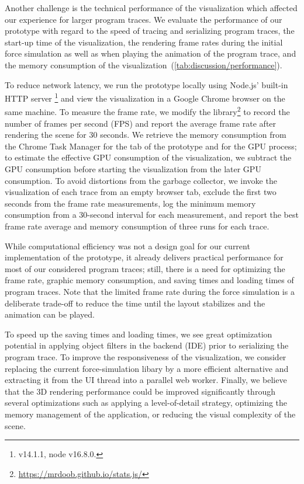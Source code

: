 Another challenge is the technical performance of the visualization which affected our experience for larger program traces.
We evaluate the performance of our prototype with regard to the speed of tracing and serializing program traces, the start-up time of the visualization, the rendering frame rates during the initial force simulation as well as when playing the animation of the program trace, and the memory consumption of the visualization~(\cref{tab:discussion/performance}).

To reduce network latency, we run the \tfd{} prototype locally using Node.js' built-in HTTP server \footnote{ v14.1.1, node v16.8.0.} and view the visualization in a Google Chrome browser on the same machine.
To measure the frame rate, we modify the  library\footnote{\url{https://mrdoob.github.io/stats.js/}} to record the number of frames per second (FPS) and report the average frame rate after rendering the scene for 30 seconds.
We retrieve the memory consumption from the Chrome Task Manager for the tab of the \tfd{} prototype and for the GPU process; to estimate the effective GPU consumption of the visualization, we subtract the GPU consumption before starting the visualization from the later GPU consumption.
To avoid distortions from the garbage collector, we invoke the visualization of each trace from an empty browser tab, exclude the first two seconds from the frame rate measurements, log the minimum memory consumption from a 30-second interval for each measurement, and report the best frame rate average and memory consumption of three runs for each trace.

While computational efficiency was not a design goal for our current implementation of the \tfd{} prototype, it already delivers practical performance for most of our considered program traces; still, there is a need for optimizing the frame rate, graphic memory consumption, and saving times and loading times of program traces.
Note that the limited frame rate during the force simulation is a deliberate trade-off to reduce the time until the layout stabilizes and the animation can be played.

To speed up the saving times and loading times, we see great optimization potential in applying object filters in the backend (IDE) prior to serializing the program trace.
To improve the responsiveness of the visualization, we consider replacing the current force-simulation libary  by a more efficient alternative and extracting it from the UI thread into a parallel web worker.
Finally, we believe that the 3D rendering performance could be improved significantly through several optimizations such as applying a level-of-detail strategy, optimizing the memory management of the application, or reducing the visual complexity of the scene.
